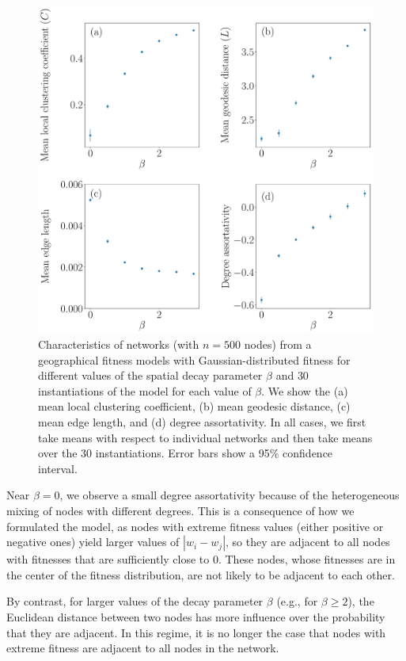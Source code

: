 \documentclass[%
 reprint,
 amsmath,amssymb,
 aps,
]{revtex4-1}
\begin{document}
\begin{figure}
    \centering
    \includegraphics[width=1.0\linewidth]{geographical_network_metrics4.pdf}
    \caption{Characteristics of networks (with $n = 500$ nodes) from a geographical fitness models with Gaussian-distributed fitness for different values of the spatial decay parameter $\beta$ and $30$ instantiations of the model for each value of $\beta$. We show the (a) mean local clustering coefficient, (b) mean geodesic distance, (c) mean edge length, and (d) degree assortativity. In all cases, we first take means with respect to individual networks and then take means over the $30$ instantiations. Error bars show a 95\% confidence interval.
    }
    \label{fig:gf_metrics}
\end{figure}


Near $\beta = 0$, we observe a 
small degree assortativity because of the heterogeneous mixing of nodes with different degrees. This is a consequence of how we formulated the model, as nodes with extreme fitness values (either positive or negative ones) yield larger values of $|w_i - w_j|$, so they are adjacent to all nodes with fitnesses that are sufficiently close to $0$. These nodes, whose fitnesses are in the center of the fitness distribution, are not likely to be adjacent to each other.

By contrast, for larger values of the decay parameter $\beta$ (e.g., for $\beta \geq 2$), the Euclidean distance between two nodes has more influence over the probability that they are adjacent. In this regime, it is no longer the case that nodes with extreme fitness are adjacent to all nodes in the network. 
\end{document}
